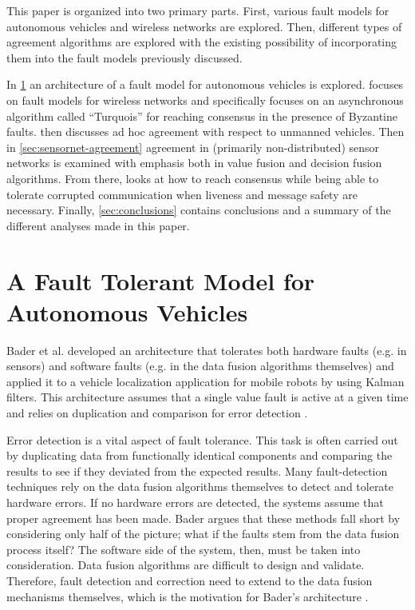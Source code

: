 \documentclass[twoside, conference]{IEEEtran}%
\begin{document}
This paper is organized into two primary parts.  First, various fault models for autonomous vehicles and wireless networks are explored.  Then, different types of agreement algorithms are explored with the existing possibility of incorporating them into the fault models previously discussed.

In \cref{sec:ftmodel-autonomous} an architecture of a fault model for autonomous vehicles is explored.   focuses on fault models for wireless networks and specifically focuses on an asynchronous algorithm called ``Turquois'' for reaching consensus in the presence of Byzantine faults.   then discusses ad hoc agreement with respect to unmanned vehicles.  Then in \cref{sec:sensornet-agreement} agreement in (primarily non-distributed) sensor networks is examined with emphasis both in value fusion and decision fusion algorithms.  From there,  looks at how to reach consensus while being able to tolerate corrupted communication when liveness and message safety are necessary.  Finally, \cref{sec:conclusions} contains conclusions and a summary of the different analyses made in this paper.

\section{A Fault Tolerant Model for Autonomous Vehicles}\label{sec:ftmodel-autonomous} %

Bader et al. developed an architecture that tolerates both hardware faults (e.g. in sensors) and software faults (e.g. in the data fusion algorithms themselves) and applied it to a vehicle localization application for mobile robots by using Kalman filters. This architecture assumes that a single value fault is active at a given time and relies on duplication and comparison for error detection \cite{Bader2014}.

Error detection is a vital aspect of fault tolerance. This task is often carried out by duplicating data from functionally identical components and comparing the results to see if they deviated from the expected results. Many fault-detection techniques rely on the data fusion algorithms themselves to detect and tolerate hardware errors. If no hardware errors are detected, the systems assume that proper agreement has been made. Bader argues that these methods fall short by considering only half of the picture; what if the faults stem from the data fusion process itself? The software side of the system, then, must be taken into consideration. Data fusion algorithms are difficult to design and validate. Therefore, fault detection and correction need to extend to the data fusion mechanisms themselves, which is the motivation for Bader's architecture \cite{Bader2014}.
\end{document}
